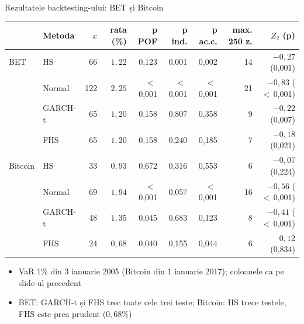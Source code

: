 \begin{frame}{Rezultatele backtesting-ului: BET și Bitcoin}
\itemsize{\footnotesize}
\begin{center}
\scriptsize
\begin{tabular}{llrrrrrrr}
\toprule
& Metoda & $x$ & rata (\%) & p POF & p ind. & p ac.c. & max. 250 z. & $Z_2$ (p) \\
\midrule
BET & HS & 66 & $1{,}22$ & 0{,}123 & 0{,}001 & 0{,}002 & 14 & ${-0{,}27}$ (0{,}001) \\
 & Normal & 122 & $2{,}25$ & $<$\,0{,}001 & $<$\,0{,}001 & $<$\,0{,}001 & 21 & ${-0{,}83}$ ($<$\,0{,}001) \\
 & GARCH-t & 65 & $1{,}20$ & 0{,}158 & 0{,}807 & 0{,}358 & 9 & ${-0{,}22}$ (0{,}007) \\
 & FHS & 65 & $1{,}20$ & 0{,}158 & 0{,}240 & 0{,}185 & 7 & ${-0{,}18}$ (0{,}021) \\
\midrule
Bitcoin & HS & 33 & $0{,}93$ & 0{,}672 & 0{,}316 & 0{,}553 & 6 & ${-0{,}07}$ (0{,}224) \\
 & Normal & 69 & $1{,}94$ & $<$\,0{,}001 & 0{,}057 & $<$\,0{,}001 & 16 & ${-0{,}56}$ ($<$\,0{,}001) \\
 & GARCH-t & 48 & $1{,}35$ & 0{,}045 & 0{,}683 & 0{,}123 & 8 & ${-0{,}41}$ ($<$\,0{,}001) \\
 & FHS & 24 & $0{,}68$ & 0{,}040 & 0{,}155 & 0{,}044 & 6 & ${0{,}12}$ (0{,}834) \\
\bottomrule
\end{tabular}
\end{center}
\begin{itemize}
    \item VaR 1\% din 3 ianuarie 2005 (Bitcoin din 1 ianuarie 2017); coloanele ca pe slide-ul precedent
    \item BET: GARCH-t și FHS trec toate cele trei teste; Bitcoin: HS trece testele, FHS este prea prudent ($0{,}68\%$)
\end{itemize}
\end{frame}

